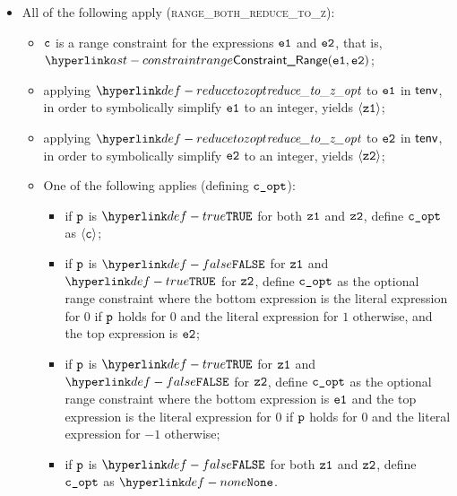 \begin{itemize}
  \item All of the following apply (\textsc{range\_both\_reduce\_to\_z}):
  \begin{itemize}
    \item $\texttt{c}$ is a range constraint for the expressions $\texttt{e1}$ and $\texttt{e2}$, that is, \\
          $\ConstraintRange(\veone, \vetwo)$;
    \item applying $\reducetozopt$ to $\texttt{e1}$ in $\textsf{tenv}$, in order to symbolically simplify $\texttt{e1}$ to an integer,
          yields $\langle\texttt{z1}\rangle$;
    \item applying $\reducetozopt$ to $\texttt{e2}$ in $\textsf{tenv}$, in order to symbolically simplify $\texttt{e2}$ to an integer,
          yields $\langle\texttt{z2}\rangle$;
    \item One of the following applies (defining $\texttt{c\_opt}$):
    \begin{itemize}
      \item if $\texttt{p}$ is $\True$ for both $\texttt{z1}$ and $\texttt{z2}$, define $\texttt{c\_opt}$ as $\langle\texttt{c}\rangle$;
      \item if $\texttt{p}$ is $\False$ for $\texttt{z1}$ and $\True$ for $\texttt{z2}$, define $\texttt{c\_opt}$ as the optional range constraint
            where the bottom expression is the literal expression for $0$ if $\texttt{p}$ holds for $0$ and the literal expression for $1$ otherwise,
            and the top expression is $\texttt{e2}$;
      \item if $\texttt{p}$ is $\True$ for $\texttt{z1}$ and $\False$ for $\texttt{z2}$, define $\texttt{c\_opt}$ as the optional range constraint
            where the bottom expression is $\texttt{e1}$ and the top expression is the literal expression for $0$ if $\texttt{p}$ holds for $0$
            and the literal expression for $-1$ otherwise;
      \item if $\texttt{p}$ is $\False$ for both $\texttt{z1}$ and $\texttt{z2}$, define $\texttt{c\_opt}$ as $\None$.
    \end{itemize}
  \end{itemize}


\end{itemize}
